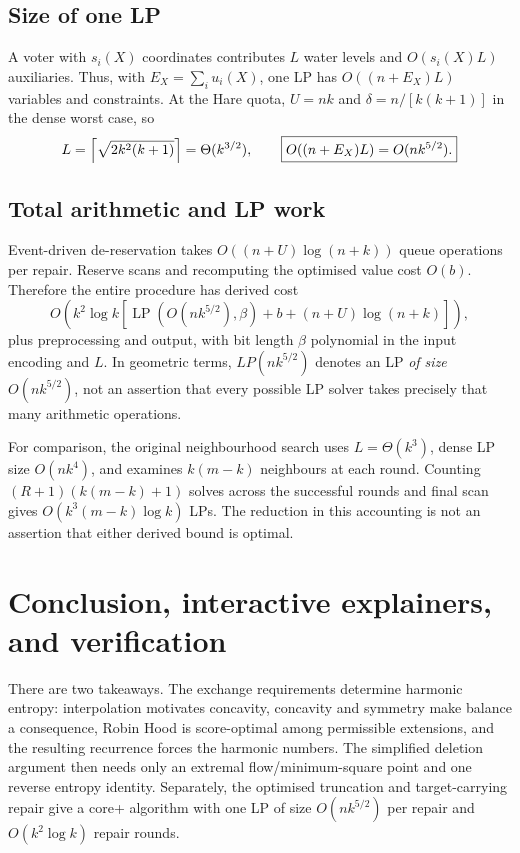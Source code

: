 \documentclass[11pt,a4paper]{article}
\theoremstyle{definition}
\theoremstyle{remark}
\newcommand{\LP}{\operatorname{LP}}
\begin{document}
\subsection{Size of one LP}
A voter with $s_i(X)$ coordinates contributes $L$ water levels and $O(s_i(X)L)$ auxiliaries. Thus, with $E_X=\sum_iu_i(X)$, one LP has $O((n+E_X)L)$ variables and constraints. At the Hare quota, $U=nk$ and $\delta=n/[k(k+1)]$ in the dense worst case, so
\[
L=\Bigl\lceil\sqrt{2k^2(k+1)}\Bigr\rceil=\Theta(k^{3/2}),
\qquad \boxed{O((n+E_X)L)=O(nk^{5/2}).}
\]

\subsection{Total arithmetic and LP work}
Event-driven de-reservation takes $O((n+U)\log(n+k))$ queue operations per repair. Reserve scans and recomputing the optimised value cost $O(b)$. Therefore the entire procedure has derived cost
\[
\boxed{
O\!\left(k^2\log k\left[
\LP\!\left(O(nk^{5/2}),\beta\right)+b+(n+U)\log(n+k)
\right]\right),}
\]
plus preprocessing and output, with bit length $\beta$ polynomial in the input encoding and $L$. In geometric terms, $LP(nk^{5/2})$ denotes an LP \emph{of size} $O(nk^{5/2})$, not an assertion that every possible LP solver takes precisely that many arithmetic operations.

For comparison, the original neighbourhood search uses $L=\Theta(k^3)$, dense LP size $O(nk^4)$, and examines $k(m-k)$ neighbours at each round. Counting $(R+1)(k(m-k)+1)$ solves across the successful rounds and final scan gives $O(k^3(m-k)\log k)$ LPs. The reduction in this accounting is not an assertion that either derived bound is optimal.

\clearpage
\section{Conclusion, interactive explainers, and verification}
There are two takeaways. The exchange requirements determine harmonic entropy: interpolation motivates concavity, concavity and symmetry make balance a consequence, Robin Hood is score-optimal among permissible extensions, and the resulting recurrence forces the harmonic numbers. The simplified deletion argument then needs only an extremal flow/minimum-square point and one reverse entropy identity. Separately, the optimised truncation and target-carrying repair give a core+ algorithm with one LP of size $O(nk^{5/2})$ per repair and $O(k^2\log k)$ repair rounds.
\end{document}
